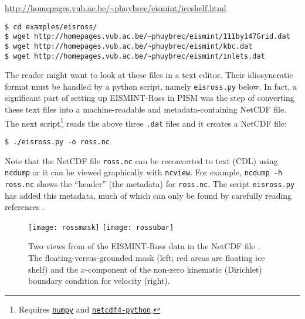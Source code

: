 \centerline{\url{http://homepages.vub.ac.be/~phuybrec/eismint/iceshelf.html}}
\small

\begin{verbatim}
$ cd examples/eisross/
$ wget http://homepages.vub.ac.be/~phuybrec/eismint/111by147Grid.dat
$ wget http://homepages.vub.ac.be/~phuybrec/eismint/kbc.dat
$ wget http://homepages.vub.ac.be/~phuybrec/eismint/inlets.dat
\end{verbatim}
\normalsize The reader might want to look at these files in a text editor.  Their idiosyncratic format must be handled by a python script, namely \texttt{eisross.py} below.  In fact, a significant part of setting up EISMINT-Ross in PISM was the step of converting these text files into a machine-readable and metadata-containing NetCDF file.  The next script\footnote{Requires \href{http://numpy.scipy.org/}{\texttt{numpy}} and \href{http://code.google.com/p/netcdf4-python/}{\texttt{netcdf4-python}}.} reads the above three \texttt{.dat} files and it creates a NetCDF file:

\begin{verbatim}
$ ./eisross.py -o ross.nc
\end{verbatim}
Note that the NetCDF file \texttt{ross.nc} can be reconverted to text (CDL) using \texttt{ncdump} or it can be viewed graphically with \texttt{ncview}.  For example, \texttt{ncdump -h ross.nc} shows the ``header'' (the metadata) for \texttt{ross.nc}.  The script \texttt{eisross.py} has added this metadata, much of which can only be found by carefully reading references \cite{RIGGS2,RIGGS1,MacAyealetal}.

\begin{figure}[ht]
\centering
\texttt{[image: rossmask]} \qquad \texttt{[image: rossubar]}
\caption{Two views from  of the EISMINT-Ross data in the NetCDF file .  The floating-versus-grounded mask (left; red areas are floating ice shelf) and the $x$-component of the non-zero kinematic (Dirichlet) boundary condition for velocity (right).}
\label{fig:rossmaskubar}
\end{figure}

